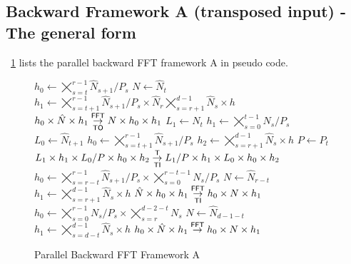 \subsection{Backward Framework A (transposed input) - The general form}
\figurename{}~\ref{fig:fft_back_A} lists the parallel backward FFT framework A in pseudo code.
\begin{figure}[ht]
  \begin{algorithmic}[1]
      \State $h_0 \gets \bigtimes_{s=t}^{r-1}\hat N_{s+1}/P_s$
      \State $N   \gets \hat N_t$
      \State $h_1 \gets \bigtimes_{s=t+1}^{r-1} \hat N_{s+1} / P_{s} \times \hat N_{r}  \bigtimes_{s=r+1}^{d-1} \hat N_s \times h$
      \State $h_0 \times \hat N \times h_1 \overset{\textsf{FFT}}{\underset{\textsf{TO}}{\rightarrow}} N \times h_0 \times h_1$
      \State
      \State $L_1 \gets N_t$
      \State $h_1 \gets \bigtimes_{s=0}^{t-1} N_{s}/P_{s}$
      \State $L_0 \gets \hat N_{t+1}$
      \State $h_0 \gets \bigtimes_{s=t+1}^{r-1}\hat N_{s+1}/P_{s}$
      \State $h_2 \gets \bigtimes_{s=r+1}^{d-1} \hat N_s \times h$
      \State $P   \gets P_{t}$
      \State $L_1 \times h_1 \times L_0/P \times h_0 \times h_2\overset{\textsf{T}}{\underset{\textsf{TI}}{\rightarrow}} L_1/P \times h_1 \times L_0 \times h_0 \times h_2$
    \EndFor
    \State $h_0 \gets \bigtimes_{s=r-t}^{r-1} \hat N_{s+1}/P_s \times \bigtimes_{s=0}^{r-t-1} N_s/P_s$
    \State $N   \gets \hat N_{r-t}$
    \State $h_1 \gets \bigtimes_{s=r+1}^{d-1} \hat N_s \times h$
    \State $\hat N \times h_0 \times h_1 \overset{\textsf{FFT}}{\underset{\textsf{TI}}{\rightarrow}} h_0 \times N \times h_1 $
      \State $h_0 \gets \bigtimes_{s=0}^{r-1} N_s/P_s \times \bigtimes_{s=r}^{d-2-t} N_s$
      \State $N   \gets \hat N_{d-1-t}$
      \State $h_1 \gets \bigtimes_{s=d-t}^{d-1} \hat N_s \times h$
      \State $h_0 \times \hat N \times h_1 \overset{\textsf{FFT}}{\rightarrow} h_0 \times N \times h_1$
    \EndFor
  \end{algorithmic}
  \caption{Parallel Backward FFT Framework A}\label{fig:fft_back_A}
\end{figure}





